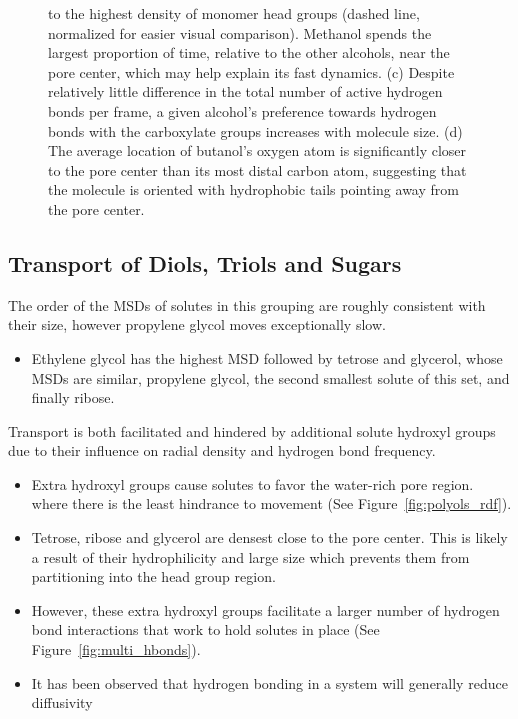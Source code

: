 \documentclass{article}
\begin{document}
\begin{figure}
{  to the highest density of monomer head groups (dashed line, normalized for easier visual
  comparison). Methanol spends the largest proportion of time, relative to the other alcohols,
  near the pore center, which may help explain its fast dynamics. (c) Despite relatively little
  difference in the total number of active hydrogen bonds per frame, a given alcohol's preference
  towards hydrogen bonds with the carboxylate groups increases with molecule size. (d) The average
  location of butanol's oxygen atom is significantly closer to the pore center than its most distal
  carbon atom, suggesting that the molecule is oriented with hydrophobic tails pointing away from
  the pore center.}\label{fig:simple_alcohols}
  \end{figure}

  \subsection*{Transport of Diols, Triols and Sugars}  %
  
  The order of the MSDs of solutes in this grouping are roughly consistent with 
  their size, however propylene glycol moves exceptionally slow.  %
  \begin{itemize}
  	\item Ethylene glycol has the highest MSD followed by tetrose
  	and glycerol, whose MSDs are similar, propylene glycol, the second smallest
  	solute of this set, and finally ribose.
  \end{itemize}
  
  Transport is both facilitated and hindered by additional solute hydroxyl groups
  due to their influence on radial density and hydrogen bond frequency.  	
  \begin{itemize} 
    \item Extra hydroxyl groups cause solutes to favor the water-rich pore region.
    where there is the least hindrance to movement (See Figure~\ref{fig:polyols_rdf}).
    \item Tetrose, ribose and glycerol are densest close to the pore center. This is 
    likely a result of their hydrophilicity and large size which prevents them from
    partitioning into the head group region.
    \item However, these extra hydroxyl groups facilitate a larger number of 
    hydrogen bond interactions that work to hold solutes in place (See Figure~\ref{fig:multi_hbonds}).
    \item It has been observed that hydrogen bonding in a system will generally
    reduce diffusivity~\cite{srinivas_computer_1999}
  \end{itemize}
  
\end{document}
